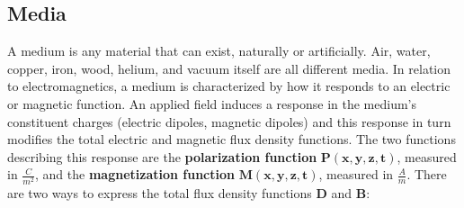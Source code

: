 \subsection{Media}

A medium is any material that can exist, naturally or artificially. Air,
water, copper, iron, wood, helium, and vacuum itself are all different media.
In relation to electromagnetics, a medium is characterized by how it responds
to an electric or magnetic function. An applied field induces a response in
the medium's constituent charges (electric dipoles, magnetic dipoles) and
this response in turn modifies the total electric and magnetic flux density
functions. The two functions describing this response are the \textbf{polarization
function} \( \mathbf{P(x,y,z,t)} \), measured in \( \frac{C}{m^2} \), and
the \textbf{magnetization function} \( \mathbf{M(x,y,z,t)} \), measured in
\( \frac{A}{m} \).
There are two ways to express the total flux density functions \( \mathbf{D} \) and
\( \mathbf{B} \):
